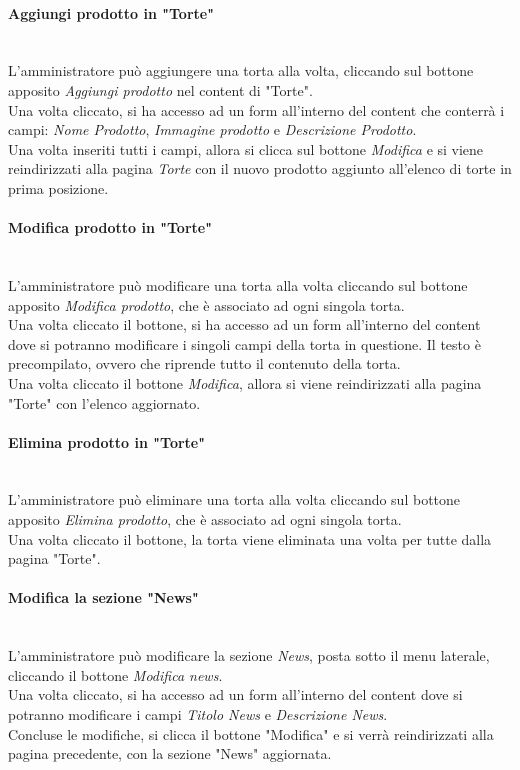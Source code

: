 \paragraph{Aggiungi prodotto in "Torte"}\mbox{}\\
\label{par:AddT}
L'amministratore può aggiungere una torta alla volta, cliccando sul bottone apposito \emph{Aggiungi prodotto} nel content di "Torte".\\ Una volta cliccato, si ha accesso ad un form all'interno del content che conterrà i campi: \emph{Nome Prodotto}, \emph{Immagine prodotto} e \emph{Descrizione Prodotto}.\\ 
Una volta inseriti tutti i campi, allora si clicca sul bottone \emph{Modifica} e si viene reindirizzati alla pagina \emph{Torte} con il nuovo prodotto aggiunto all'elenco di torte in prima posizione.\\

\paragraph{Modifica prodotto in "Torte"}\mbox{}\\
\label{par:ModT}
L'amministratore può modificare una torta alla volta cliccando sul bottone apposito \emph{Modifica prodotto}, che è associato ad ogni singola torta.\\ 
Una volta cliccato il bottone, si ha accesso ad un form all'interno del content dove si potranno modificare i singoli campi della torta in questione. Il testo è precompilato, ovvero che riprende tutto il contenuto della torta.\\ 
Una volta cliccato il bottone \emph{Modifica}, allora si viene reindirizzati alla pagina "Torte" con l'elenco aggiornato.\\

\paragraph{Elimina prodotto in "Torte"}\mbox{}\\
\label{par:DelT}
L'amministratore può eliminare una torta alla volta cliccando sul bottone apposito \emph{Elimina prodotto}, che è associato ad ogni singola torta.\\ 
Una volta cliccato il bottone, la torta viene eliminata una volta per tutte dalla pagina "Torte".\\

\paragraph{Modifica la sezione "News"}\mbox{}\\
\label{par:ModN}
L'amministratore può modificare la sezione \emph{News}, posta sotto il menu laterale, cliccando il bottone \emph{Modifica news}.\\ 
Una volta cliccato, si ha accesso ad un form all'interno del content dove si potranno modificare i campi \emph{Titolo News} e \emph{Descrizione News}.\\
Concluse le modifiche, si clicca il bottone "Modifica" e si verrà reindirizzati alla pagina precedente, con la sezione "News" aggiornata.\\

